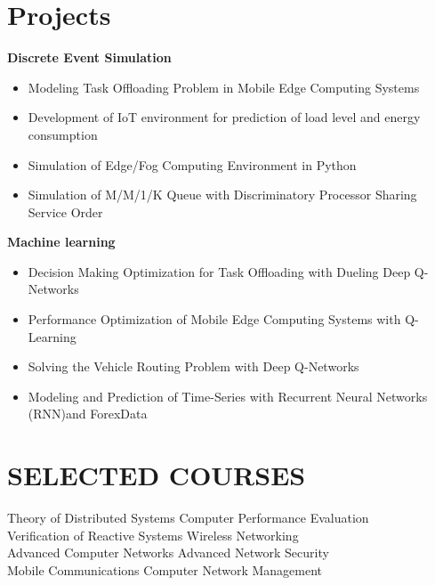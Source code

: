 \documentclass[11pt]{article}
\begin{document}
\section{Projects}
\textbf{Discrete Event Simulation}
\begin{itemize}
	\item Modeling Task Offloading Problem in Mobile Edge Computing Systems \vspace{-2mm}
	\item Development of IoT environment for prediction of load level and energy consumption \vspace{-2mm}
	\item Simulation of Edge/Fog Computing Environment in Python \vspace{-2mm}
	\item Simulation of M/M/1/K Queue with Discriminatory Processor Sharing Service Order
\end{itemize}
\textbf{Machine learning}
\begin{itemize}
	\item Decision Making Optimization for Task Offloading with Dueling Deep Q-Networks  \vspace{-2mm}
	\item Performance Optimization of Mobile Edge Computing Systems with Q-Learning \vspace{-2mm}
	\item Solving the Vehicle Routing Problem with Deep Q-Networks \vspace{-2mm}
	\item Modeling and Prediction of Time-Series with Recurrent Neural Networks (RNN)and ForexData 
\end{itemize}

\section{SELECTED COURSES}

		Theory of Distributed Systems  \hfill Computer Performance Evaluation\\
		Verification of Reactive Systems    \hspace{41.5mm} Wireless Networking \\
		Advanced Computer Networks \hspace{44.4mm}  Advanced Network Security\\
		Mobile Communications \hspace{56mm}   Computer Network Management
\end{document}
